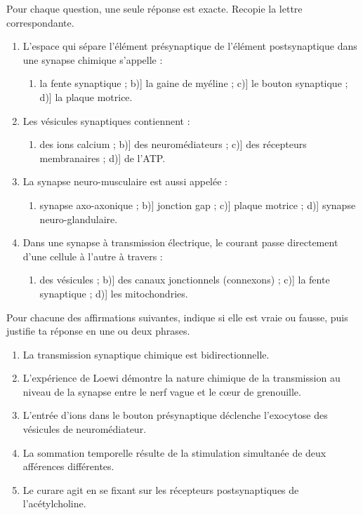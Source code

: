 \documentclass[11pt]{article}
\begin{document}
\begin{exercice}
Pour chaque question, une seule réponse est exacte. Recopie la lettre correspondante.
\begin{enumerate}
\item L'espace qui sépare l'élément présynaptique de l'élément postsynaptique dans une synapse chimique s'appelle :
\begin{enumerate}
\item[a)] la fente synaptique ; b)] la gaine de myéline ; c)] le bouton synaptique ; d)] la plaque motrice.
\end{enumerate}
\item Les vésicules synaptiques contiennent :
\begin{enumerate}
\item[a)] des ions calcium ; b)] des neuromédiateurs ; c)] des récepteurs membranaires ; d)] de l'ATP.
\end{enumerate}
\item La synapse neuro-musculaire est aussi appelée :
\begin{enumerate}
\item[a)] synapse axo-axonique ; b)] jonction gap ; c)] plaque motrice ; d)] synapse neuro-glandulaire.
\end{enumerate}
\item Dans une synapse à transmission électrique, le courant passe directement d'une cellule à l'autre à travers :
\begin{enumerate}
\item[a)] des vésicules ; b)] des canaux jonctionnels (connexons) ; c)] la fente synaptique ; d)] les mitochondries.
\end{enumerate}
\end{enumerate}
\end{exercice}

\begin{exercice}
Pour chacune des affirmations suivantes, indique si elle est vraie ou fausse, puis justifie ta réponse en une ou deux phrases.
\begin{enumerate}
\item La transmission synaptique chimique est bidirectionnelle.
\item L'expérience de Loewi démontre la nature chimique de la transmission au niveau de la synapse entre le nerf vague et le cœur de grenouille.
\item L'entrée d'ions  dans le bouton présynaptique déclenche l'exocytose des vésicules de neuromédiateur.
\item La sommation temporelle résulte de la stimulation simultanée de deux afférences différentes.
\item Le curare agit en se fixant sur les récepteurs postsynaptiques de l'acétylcholine.
\end{enumerate}
\end{exercice}
\end{document}
